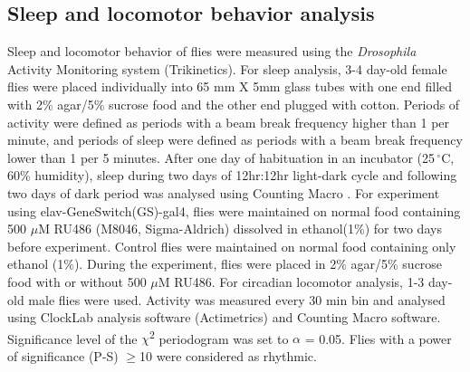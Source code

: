 \subsection*{Sleep and locomotor behavior analysis}

Sleep and locomotor behavior of flies were measured using the \emph{Drosophila} Activity Monitoring system (Trikinetics).
For sleep analysis, 3-4 day-old female flies were placed individually into 65 mm X 5mm glass tubes with one end filled with 2\% agar/5\% sucrose food and the other end plugged with cotton.
Periods of activity were defined as periods with a beam break frequency higher than 1 per minute, and periods of sleep were defined as periods with a beam break frequency lower than 1 per 5 minutes\cite{Shaw:2000ui}.
After one day of habituation in an incubator (25$\,^{\circ}\mathrm{C}$, 60\% humidity), sleep during two days of 12hr:12hr light-dark cycle and following two days of dark period was analysed using Counting Macro \cite{pfeiffenberger:2010ab}.
For experiment using elav-GeneSwitch(GS)-gal4, flies were maintained on normal food containing 500 $\mu$M RU486 (M8046, Sigma-Aldrich) dissolved in ethanol(1\%) for two days before experiment.
Control flies were maintained on normal food containing only ethanol (1\%).
During the experiment, flies were placed in 2\% agar/5\% sucrose food with or without 500 $\mu$M RU486. 
For circadian locomotor analysis, 1-3 day-old male flies were used. Activity was measured every 30 min bin and analysed using ClockLab analysis software (Actimetrics) and Counting Macro software. Significance level of the $\chi$\textsuperscript{2} periodogram was set to $\alpha$ = 0.05.
Flies with a power of significance (P-S) $\geq$10 were considered as rhythmic.
